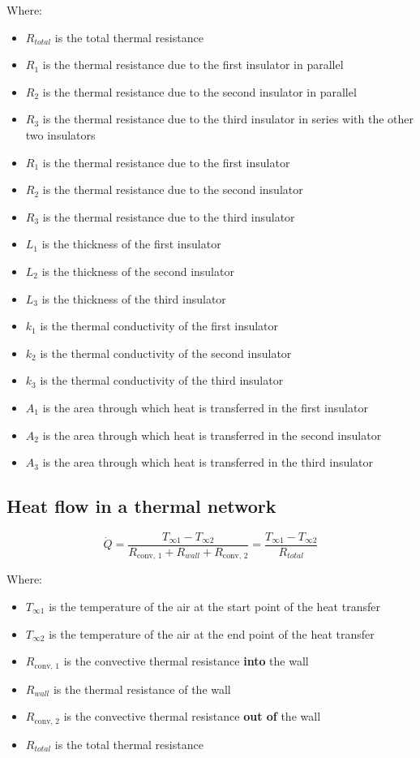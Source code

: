 \documentclass[11pt]{article}
\begin{document}
Where:
\begin{itemize}
\item \(R_{total}\) is the total thermal resistance
\item \(R_1\) is the thermal resistance due to the first insulator in parallel
\item \(R_2\) is the thermal resistance due to the second insulator in parallel
\item \(R_3\) is the thermal resistance due to the third insulator in series with the other two insulators
\item \(R_1\) is the thermal resistance due to the first insulator
\item \(R_2\) is the thermal resistance due to the second insulator
\item \(R_3\) is the thermal resistance due to the third insulator
\item \(L_1\) is the thickness of the first insulator
\item \(L_2\) is the thickness of the second insulator
\item \(L_3\) is the thickness of the third insulator
\item \(k_1\) is the thermal conductivity of the first insulator
\item \(k_2\) is the thermal conductivity of the second insulator
\item \(k_3\) is the thermal conductivity of the third insulator
\item \(A_1\) is the area through which heat is transferred in the first insulator
\item \(A_2\) is the area through which heat is transferred in the second insulator
\item \(A_3\) is the area through which heat is transferred in the third insulator
\end{itemize}
\subsection{Heat flow in a thermal network}
\label{sec:orgddc8823}
\[\dot{Q} = \frac{T_{\infty 1} - T_{\infty 2}}{R_{\text{conv, 1}} + R_{wall} + R_{\text{conv, 2}}} = \frac{T_{\infty 1} - T_{\infty 2}}{R_{total}}\]

Where:
\begin{itemize}
\item \(T_{\infty 1}\) is the temperature of the air at the start point of the heat transfer
\item \(T_{\infty 2}\) is the temperature of the air at the end point of the heat transfer
\item \(R_{\text{conv, 1}}\) is the convective thermal resistance \textbf{into} the wall
\item \(R_{wall}\) is the thermal resistance of the wall
\item \(R_{\text{conv, 2}}\) is the convective thermal resistance \textbf{out of} the wall
\item \(R_{total}\) is the total thermal resistance
\end{itemize}
\end{document}
